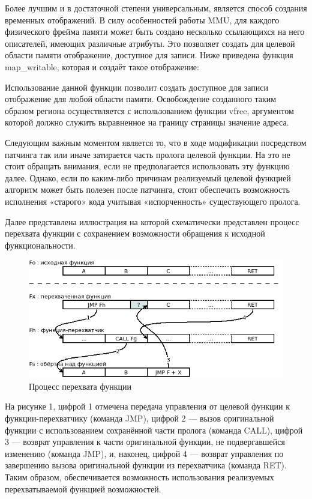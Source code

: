 Более лучшим и в достаточной степени универсальным, является способ создания временных отображений. В силу особенностей работы MMU, для каждого физического фрейма памяти может быть создано несколько ссылающихся на него описателей, имеющих различные атрибуты. Это позволяет создать для целевой области памяти отображение, доступное для записи. Ниже приведена функция map\_writable, которая и создаёт такое отображение:

Использование данной функции позволит создать доступное для записи отображение для любой области памяти. Освобождение созданного таким образом региона осуществляется с использованием функции vfree, аргументом которой должно служить выравненное на границу страницы значение адреса.

Следующим важным моментом является то, что в ходе модификации посредством патчинга так или иначе затирается часть пролога целевой функции. На это не стоит обращать внимания, если не предполагается использовать эту функцию далее. Однако, если по каким-либо причинам реализуемый целевой функцией алгоритм может быть полезен после патчинга, стоит обеспечить возможность исполнения «старого» кода учитывая «испорченность» существующего пролога.

Далее представлена иллюстрация на которой схематически представлен процесс перехвата функции с сохранением возможности обращения к исходной функциональности.

\begin{figure}[H]
  \centering
  \includegraphics[width=\textwidth]{img/hookScheme}
  \caption{Процесс перехвата функции}
\end{figure}

На рисунке 1, цифрой 1 отмечена передача управления от целевой функции к функции-перехватчику (команда JMP), цифрой 2 — вызов оригинальной функции с использованием сохранённой части пролога (команда CALL), цифрой 3 — возврат управления к части оригинальной функции, не подвергавшейся изменению (команда JMP), и, наконец, цифрой 4 — возврат управления по завершению вызова оригинальной функции из перехватчика (команда RET). Таким образом, обеспечивается возможность использования реализуемых перехватываемой функцией возможностей.
